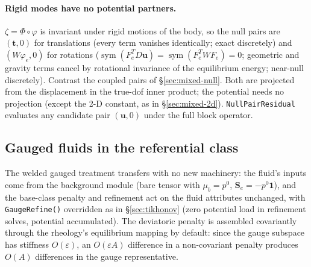 \documentclass[11pt]{article}
\numberwithin{equation}{section}
\theoremstyle{remark}
\newcommand{\eps}{\varepsilon}
\newcommand{\sym}{\operatorname{sym}}
\newcommand{\vu}{\mathbf{u}}
\newcommand{\vt}{\mathbf{t}}
\newcommand{\Se}{\mathbf{S}_e}
\newcommand{\code}[1]{\texttt{#1}}
\begin{document}
\paragraph{Rigid modes have no potential partners.} $\zeta = \Phi\circ
\varphi$ is invariant under rigid motions of the body, so the null pairs are
$(\vt,0)$ for translations (every term vanishes identically; exact
discretely) and $(W\varphi_e,0)$ for rotations ($\sym(F_e^TD\vu) =
\sym(F_e^TWF_e) = 0$; geometric and gravity terms cancel by rotational
invariance of the equilibrium energy; near-null discretely). Contrast the
coupled pairs of \S\ref{sec:mixed-null}. Both are projected from the
displacement in the true-dof inner product; the potential needs no
projection (except the 2-D constant, as in \S\ref{sec:mixed-2d}).
\code{NullPairResidual} evaluates any candidate pair $(\vu,0)$ under the
full block operator.

\subsection{Gauged fluids in the referential class}
\label{sec:ref-gauged}

The welded gauged treatment transfers with no new machinery: the fluid's
inputs come from the background module (bare tensor with $\mu_b = p^0$,
$\Se = -p^0\mathbf{1}$), and the base-class penalty and refinement act on
the fluid attributes unchanged, with \code{GaugeRefine()} overridden as in
\S\ref{sec:tikhonov} (zero potential load in refinement solves, potential
accumulated). The deviatoric penalty is assembled covariantly through the
rheology's equilibrium mapping by default: since the gauge subspace has
stiffness $O(\eps)$, an $O(\eps A)$ difference in a non-covariant penalty
produces $O(A)$ differences in the gauge representative.
\end{document}
